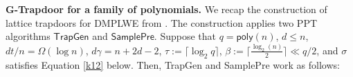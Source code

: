 \documentclass[runningheads]{llncs}
\begin{document}
\noindent\textbf{G-Trapdoor for a family of polynomials.}
 We recap the construction of lattice trapdoors for {DMPLWE} from \cite{LVV19}. The construction applies two PPT algorithms $\mathsf{TrapGen}$ and $\mathsf{SamplePre}$. Suppose that $q=\textsf{poly}(n)$, $d \leq n$, $dt/n=\Omega(\log n)$, $d\gamma=n+2d-2$, $\tau:=\lceil \log_2 q \rceil$,  $\beta:=\lceil \frac{\log_2(n)}{2} \rceil  \ll q/2$, and $\sigma$ satisfies Equation \eqref{k12} below. Then, \textsf{TrapGen} and\textsf{ SamplePre} work as follows:  
\end{document}
